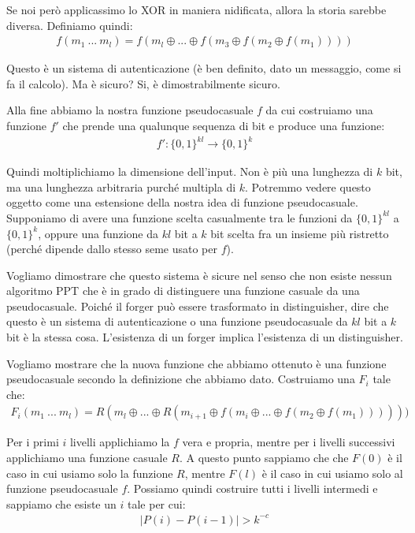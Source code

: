 \noindent Se noi però applicassimo lo XOR in maniera nidificata, allora la storia sarebbe diversa. Definiamo quindi:
\begin{align*}
    f(m_1 \ ... \ m_l) = f(m_l \oplus ... \oplus f(m_3 \oplus f(m_2 \oplus f(m_1))))
\end{align*}

\noindent Questo è un sistema di autenticazione (è ben definito, dato un messaggio, come si fa il calcolo). Ma è sicuro? Si, è dimostrabilmente sicuro. 

Alla fine abbiamo la nostra funzione pseudocasuale $f$ da cui costruiamo una funzione $f'$ che prende una qualunque sequenza di bit e produce una funzione:
\begin{align*}
    f': \{0, 1 \}^{kl} \rightarrow \{0,1 \}^k
\end{align*}

\noindent Quindi moltiplichiamo la dimensione dell'input. Non è più una lunghezza di $k$ bit, ma una lunghezza arbitraria purché multipla di $k$. Potremmo vedere questo oggetto come una estensione della nostra idea di funzione pseudocasuale. Supponiamo di avere una funzione scelta casualmente tra le funzioni da $ \{0, 1 \}^{kl}$ a $\{0,1 \}^k$, oppure una funzione da $kl$ bit a $k$ bit scelta fra un insieme più ristretto (perché dipende dallo stesso seme usato per $f$). 

Vogliamo dimostrare che questo sistema è sicure nel senso che non esiste nessun algoritmo PPT che è in grado di distinguere una funzione casuale da una pseudocasuale. Poiché il forger può essere trasformato in distinguisher, dire che questo è un sistema di autenticazione o una funzione pseudocasuale da $kl$ bit a $k$ bit è la stessa cosa. L'esistenza di un forger implica l'esistenza di un distinguisher.

Vogliamo mostrare che la nuova funzione che abbiamo ottenuto è una funzione pseudocasuale secondo la definizione che abbiamo dato. Costruiamo una $F_i$ tale che:
\begin{align*}
    F_i(m_1 \ ... \ m_l) = R(m_l \oplus ... \oplus R(m_{i+1} \oplus f(m_i \oplus ... \oplus f(m_2 \oplus f(m_1))))))
\end{align*}

\noindent Per i primi $i$ livelli applichiamo la $f$ vera e propria, mentre per i livelli successivi applichiamo una funzione casuale $R$. A questo punto sappiamo che che $F(0)$ è il caso in cui usiamo solo la funzione $R$, mentre $F(l)$ è il caso in cui usiamo solo al funzione pseudocasuale $f$. Possiamo quindi costruire tutti i livelli intermedi e sappiamo che esiste un $i$ tale per cui:
\begin{align*}
    \left|P(i) - P(i-1)\right| > k^{-c}
\end{align*}

